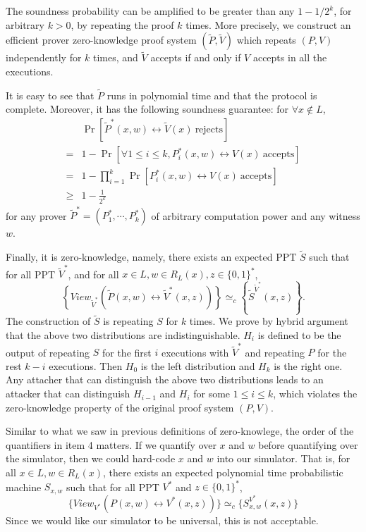 The soundness probability can be amplified to be greater than any $1 - 1/2^k$, for arbitrary $k > 0$, by repeating the proof $k$ times. More precisely, we construct an efficient prover zero-knowledge proof system $(\tilde P, \tilde V)$ which repeats $(P,V)$ independently for $k$ times, and $\tilde V$ accepts if and only if $V$ accepts in all the executions.

It is easy to see that $\tilde P$ runs in polynomial time and that the protocol is complete.
Moreover, it has the following soundness guarantee:
for $\forall x \notin L$,
\begin{align*}
& \Pr \left[\tilde P^*(x,w) \leftrightarrow \tilde V(x) \ \text{rejects}\right]\\
= & 1- \Pr \left[\forall 1\leq i\leq k, P^*_i(x,w) \leftrightarrow V(x) \ \text{accepts}\right] \\
= & 1- \prod_{i=1}^k \Pr \left[P^*_i(x,w) \leftrightarrow V(x) \ \text{accepts}\right] \\
\geq& 1-\frac{1}{2^k}
\end{align*}
for any prover $\tilde P^*=(P^*_1, \cdots, P^*_k)$ of arbitrary computation power and any witness $w$.

Finally, it  is zero-knowledge, namely, there exists an expected PPT $\tilde S$ such that for all PPT $\tilde V^*$, and for all $x \in L, w \in R_L (x), z \in \{ 0, 1 \}^*$,
$$\left\{ View_{\tilde V^*} (\tilde P(x,w) \leftrightarrow \tilde V^* (x,z)) \right\} \simeq_c \left\{ \tilde S^{\tilde V^*} (x,z) \right\}.$$
The construction of $\tilde S$ is repeating $S$ for $k$ times. We prove by hybrid argument that the above two distributions are indistinguishable. $H_i$ is defined to be the output of repeating $S$ for the first $i$ executions with $\tilde V^*$ and repeating $P$ for the rest $k-i$ executions. Then $H_0$ is the left distribution and $H_k$ is the right one. Any attacher that can distinguish the above two distributions leads to an attacker that can distinguish $H_{i-1}$ and $H_{i}$ for some $1\leq i \leq k$, which violates the zero-knowledge property of the original proof system $(P,V)$.

Similar to what we saw in previous definitions of zero-knowlege, the order of the quantifiers in item 4 matters.
If we quantify over $x$ and $w$ before quantifying over the simulator,
then we could hard-code  $x$ and $w$ into our simulator. That is, for all $x \in L, w \in R_L (x)$, there exists an expected polynomial time probabilistic machine $S_{x,w}$ such that for all PPT $V^*$ and $z \in \{ 0, 1 \}^*$,
$$\{ View_{V^*} (P(x,w) \leftrightarrow V^* (x,z)) \} \simeq_c \{ S_{x,w}^{V^*} (x,z) \} $$
Since we would like our simulator to be universal,  this is not acceptable.

